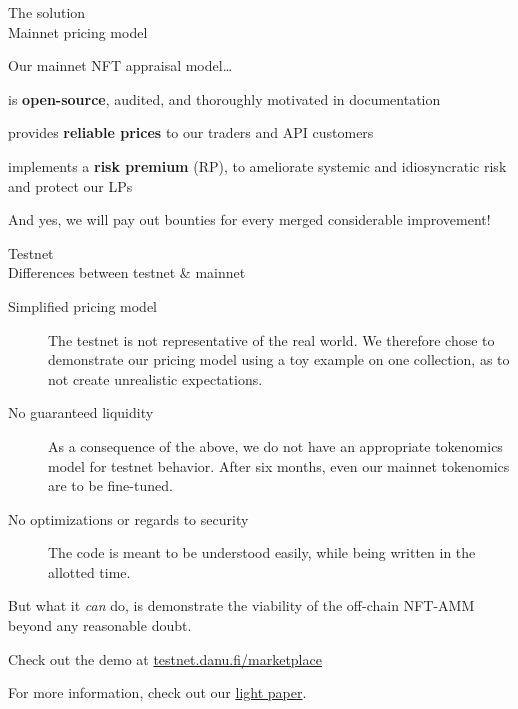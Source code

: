 \documentclass{article}
\newcommand{\mbseries}{\fontseries{mb}\selectfont}
\newenvironment{formattedslide}[3][false]{
		\newpage%
		{%
			\parindent 0pt%
			\mbseries%
			#2\\[0.25em]%
			{\large #3}\par%
		}
		\vspace{\fill}
		\color{grayscale-200}
	}{
		\vspace{\fill}
	}
\begin{document}
		\begin{formattedslide}{The solution}{Mainnet pricing model}
			Our mainnet NFT appraisal model\ldots
			\begin{advantages}
			\item is \textbf{open-source}, audited, and thoroughly motivated in documentation
			\item provides \textbf{reliable prices} to our traders and API customers
			\item implements a \textbf{risk premium} (RP), to ameliorate systemic and idiosyncratic risk and protect our LPs
			\end{advantages}


			And yes, we will pay out bounties for every merged considerable improvement!
		\end{formattedslide}

		

		\begin{formattedslide}{Testnet}{Differences between testnet \& mainnet}
			\begin{description}
			\item [Simplified pricing model] The testnet is not representative of the real world. We therefore chose to demonstrate our pricing model using a toy example on one collection, as to not create unrealistic expectations.

			\item [No guaranteed liquidity] As a consequence of the above, we do not have an appropriate tokenomics model for testnet behavior. After six months, even our mainnet tokenomics are to be fine-tuned.

			\item [No optimizations or regards to security] The code is meant to be understood easily, while being written in the allotted time.
			\end{description}

			But what it \emph{can} do, is demonstrate the viability of the off-chain NFT-AMM beyond any reasonable doubt.
		\end{formattedslide}

		\newpage
		\vspace*{\fill}
		{\parindent 0pt%
			{\mbseries\large Check out the demo at \href{https://testnet.danu.fi/marketplace}{testnet.danu.fi/marketplace}\\}%

			\textcolor{grayscale-200}{For more information, check out our \href{https://danu.fi/light_paper.pdf}{light paper}.}
		}
		\vspace{\fill}


	
\end{document}
